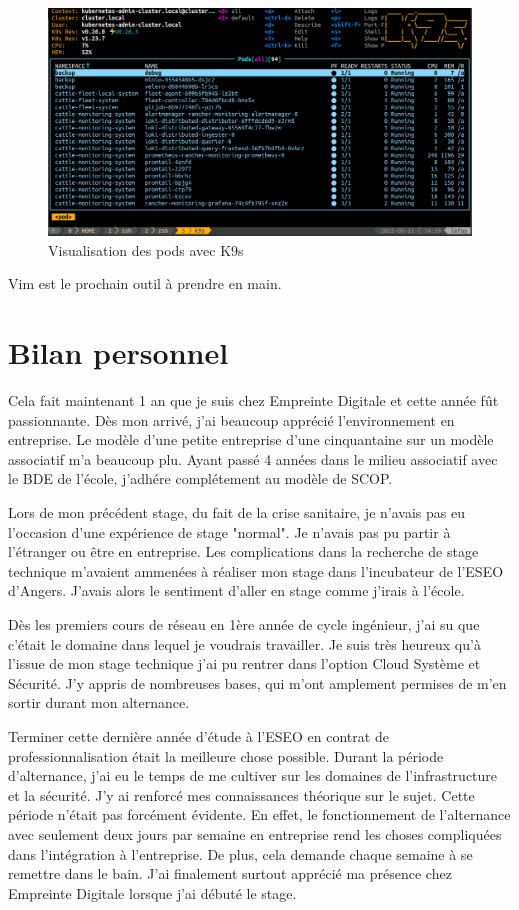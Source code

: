 \documentclass[12pt, a4paper, twoside]{article}
\begin{document}
\begin{figure}[!ht]
    \centering
        \includegraphics[width=\textwidth]{src/interface_k9s.png}
    \caption{Visualisation des pods avec K9s}
    \label{fig:k9s}
\end{figure}

Vim est le prochain outil à prendre en main.

\newpage
\part{Bilan personnel}
Cela fait maintenant 1 an que je suis chez Empreinte Digitale et cette année fût passionnante.
Dès mon arrivé, j'ai beaucoup apprécié l'environnement en entreprise.
Le modèle d'une petite entreprise d'une cinquantaine sur un modèle associatif m'a beaucoup plu.
Ayant passé 4 années dans le milieu associatif avec le BDE de l'école, j'adhére complétement au modèle de \gls{SCOP}.

Lors de mon précédent stage, du fait de la crise sanitaire, je n'avais pas eu l'occasion d'une expérience de stage "normal".
Je n'avais pas pu partir à l'étranger ou être en entreprise.
Les complications dans la recherche de stage technique m'avaient ammenées à réaliser mon stage dans l'incubateur de l'ESEO d'Angers.
J'avais alors le sentiment d'aller en stage comme j'irais à l'école.

Dès les premiers cours de réseau en 1ère année de cycle ingénieur, j'ai su que c'était le domaine dans lequel je voudrais travailler.
Je suis très heureux qu'à l'issue de mon stage technique j'ai pu rentrer dans l'option Cloud Système et Sécurité.
J'y appris de nombreuses bases, qui m'ont amplement permises de m'en sortir durant mon alternance.

Terminer cette dernière année d'étude à l'ESEO en contrat de professionnalisation était la meilleure chose possible.
Durant la période d'alternance, j'ai eu le temps de me cultiver sur les domaines de l'infrastructure et la sécurité.
J'y ai renforcé mes connaissances théorique sur le sujet.
Cette période n'était pas forcément évidente. 
En effet, le fonctionnement de l'alternance avec seulement deux jours par semaine en entreprise rend les choses compliquées dans l'intégration à l'entreprise.
De plus, cela demande chaque semaine à se remettre dans le bain.
J'ai finalement surtout apprécié ma présence chez Empreinte Digitale lorsque j'ai débuté le stage.
\end{document}

